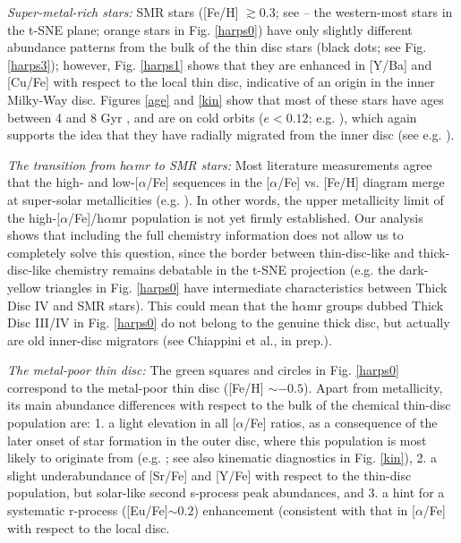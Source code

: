 \documentclass{aa}  %
\begin{document}
{\it Super-metal-rich stars:} SMR stars ([Fe/H] $\gtrsim0.3$; see \citealt{Grenon1972, Grenon1989, Grenon1999, Chiappini2009} -- the western-most stars in the t-SNE plane; orange stars in Fig. \ref{harps0}) have only slightly different abundance patterns from the bulk of the thin disc stars (black dots; see Fig. \ref{harps3}); however, Fig. \ref{harps1} shows that they are enhanced in [Y/Ba] and [Cu/Fe] with respect to the local thin disc, indicative of an origin in the inner Milky-Way disc. Figures \ref{age} and \ref{kin} show that most of these stars have ages between 4 and 8 Gyr \citep{Trevisan2011, Casagrande2011, Anders2017}, and are on cold orbits ($e<0.12$; e.g. \citealt{Kordopatis2015}), which again supports the idea that they have radially migrated from the inner disc (see e.g. \citealt{Minchev2012, Minchev2013, Minchev2014, Vera-Ciro2014, Grand2016}).

{\it The transition from h$\alpha$mr to SMR stars:} Most literature measurements agree that the high- and low-[$\alpha$/Fe] sequences in the [$\alpha$/Fe] vs. [Fe/H] diagram merge at super-solar metallicities (e.g. \citealt{Adibekyan2011, Anders2014, Hayden2015}). In other words, the upper metallicity limit of the high-[$\alpha$/Fe]/h$\alpha$mr population is not yet firmly established. Our analysis shows that including the full chemistry information does not allow us to completely solve this question, since the border between thin-disc-like and thick-disc-like chemistry remains debatable in the t-SNE projection (e.g. the dark-yellow triangles in Fig. \ref{harps0} have intermediate characteristics between Thick Disc IV and SMR stars). This could mean that the h$\alpha$mr groups dubbed Thick Disc III/IV in Fig. \ref{harps0} do not belong to the genuine thick disc, but actually are old inner-disc migrators (see Chiappini et al., in prep.). %

{\it The metal-poor thin disc:} The green squares and circles in Fig. \ref{harps0} correspond to the metal-poor thin disc ([Fe/H] $\sim-0.5$). Apart from metallicity, its main abundance differences with respect to the bulk of the chemical thin-disc population are: 1. a light elevation in all [$\alpha$/Fe] ratios, as a consequence of the later onset of star formation in the outer disc, where this population is most likely to originate from (e.g. \citealt{Nordstroem2004, Anders2014, Hayden2015}; see also kinematic diagnostics in Fig. \ref{kin}), 2. a slight underabundance of [Sr/Fe] and [Y/Fe] with respect to the thin-disc population, but solar-like second s-process peak abundances, and 3. 
a hint for a systematic r-process ([Eu/Fe]$\sim0.2$) enhancement (consistent with that in [$\alpha$/Fe] with respect to the local disc.
\end{document}
